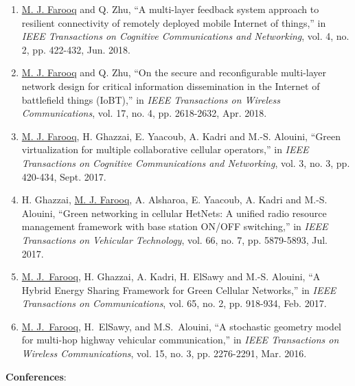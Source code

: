 \documentclass[letterpaper,11pt]{article}
\newcommand{\resumeItem}[2]{
  \item\small{
    \textbf{#1}{: #2 \vspace{-2pt}}
  }
}
\newcommand{\resumeSubItem}[2]{\resumeItem{#1}{#2}\vspace{-4pt}}
\begin{document}
\begin{enumerate}
        \item[\rm{[J6]}] \underline{M. J. Farooq} and Q. Zhu, ``A multi-layer feedback system approach to resilient connectivity of remotely deployed mobile Internet of things,'' in \textit{IEEE Transactions on Cognitive Communications and Networking}, vol. 4, no. 2, pp. 422-432, Jun. 2018.
        \item[\rm{[J5]}] \underline{M. J. Farooq} and Q. Zhu, ``On the secure and reconfigurable multi-layer network design for critical information dissemination in the Internet of battlefield things (IoBT),'' in \textit{IEEE Transactions on Wireless Communications}, vol. 17, no. 4, pp. 2618-2632, Apr. 2018.
        \item[\rm{[J4]}] \underline{M. J. Farooq}, H. Ghazzai, E. Yaacoub, A. Kadri and M.-S. Alouini, ``Green virtualization for multiple collaborative cellular operators,'' in \textit{IEEE Transactions on Cognitive Communications and Networking}, vol. 3, no. 3, pp. 420-434, Sept. 2017.
        \item[\rm{[J3]}] H. Ghazzai, \underline{M. J. Farooq}, A. Alsharoa, E. Yaacoub, A. Kadri and M.-S. Alouini, ``Green networking in cellular HetNets: A unified radio resource management framework with base station ON/OFF switching,'' in \textit{IEEE Transactions on Vehicular Technology}, vol. 66, no. 7, pp. 5879-5893, Jul. 2017.
        \item[\rm{[J2]}] \underline{M. J.~Farooq}, H. Ghazzai, A. Kadri, H. ElSawy and M.-S. Alouini, ``A Hybrid Energy Sharing Framework for Green Cellular Networks,'' in \textit{IEEE Transactions on Communications}, vol. 65, no. 2, pp. 918-934, Feb. 2017.
        \item[\rm{[J1]}] \underline{M. J.~Farooq}, H.~ElSawy, and M.S.~Alouini, ``A stochastic geometry model for multi-hop highway vehicular communication,'' in \textit{IEEE Transactions on Wireless Communications}, vol. 15, no. 3, pp. 2276-2291, Mar. 2016.
      \end{enumerate}
     \resumeSubItem{Conferences}{}
      \justifying
\end{document}
